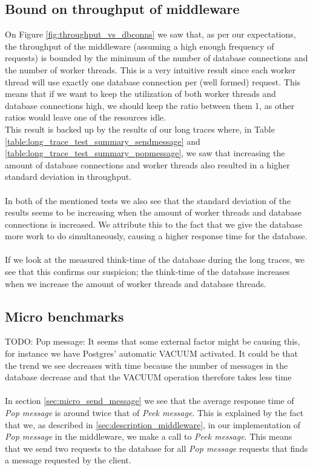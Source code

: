 \documentclass{article}
\begin{document}
        \subsection{Bound on throughput of middleware}
            \label{sec:analysis_bound_on_throughput}
            On Figure \ref{fig:throughput_vs_dbconns} we saw that, as per our expectations, the throughput of the middleware (assuming a high enough frequency of requests) is bounded by the minimum of the number of database connections and the number of worker threads. This is a very intuitive result since each worker thread will use exactly one database connection per (well formed) request. This means that if we want to keep the utilization of both worker threads and database connections high, we should keep the ratio between them 1, as other ratios would leave one of the resources idle.\\
            This result is backed up by the results of our long traces where, in Table \ref{table:long_trace_test_summary_sendmessage} and \ref{table:long_trace_test_summary_popmessage}, we saw that increasing the amount of database connections and worker threads also resulted in a higher standard deviation in throughput.\\
            \\
            In both of the mentioned tests we also see that the standard deviation of the results seems to be increasing when the amount of worker threads and database connections is increased. We attribute this to the fact that we give the database more work to do simultaneously, causing a higher response time for the database.\\
            \\
            If we look at the measured think-time of the database during the long traces, we see that this confirms our suspicion; the think-time of the database increases when we increase the amount of worker threads and database threads.

        \subsection{Micro benchmarks}
            \label{sec:analysis_micro_benchmarks}
            TODO: Pop message: It seems that some external factor might be causing this, for instance we have Postgres' automatic VACUUM activated. It could be that the trend we see decreases with time because the number of messages in the database decrease and that the VACUUM operation therefore takes less time\\
            \\
            In section \ref{sec:micro_send_message} we see that the average response time of \textit{Pop message} is around twice that of \textit{Peek message}. This is explained by the fact that we, as described in \ref{sec:description_middleware}, in our implementation of \textit{Pop message} in the middleware, we make a call to \textit{Peek message}. This means that we send two requests to the database for all \textit{Pop message} requests that finds a message requested by the client. 
\end{document}
